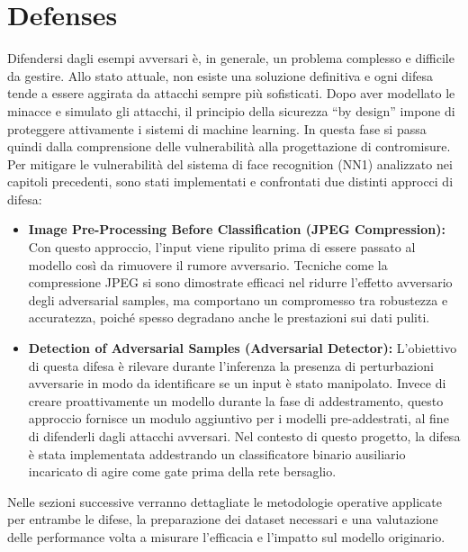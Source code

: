 \documentclass[a4paper, 12pt]{article}
\begin{document}
\section{Defenses}
Difendersi dagli esempi avversari è, in generale, un problema complesso e difficile da gestire. Allo stato attuale, 
non esiste una soluzione definitiva e ogni difesa tende a essere aggirata da attacchi sempre più sofisticati. 
Dopo aver modellato le minacce e simulato gli attacchi, il principio della sicurezza ``by design'' impone di proteggere
attivamente i sistemi di machine learning. In questa fase si passa quindi dalla comprensione delle vulnerabilità 
alla progettazione di contromisure.  Per mitigare le vulnerabilità del sistema di face recognition (NN1) analizzato
nei capitoli precedenti, sono stati implementati e confrontati due distinti approcci di difesa:
\begin{itemize}
    \item \textbf{Image Pre-Processing Before Classification (JPEG Compression):} 
    Con questo approccio, 
    l'input viene ripulito prima di essere passato al modello così da rimuovere il rumore avversario. Tecniche come la 
    compressione JPEG si sono dimostrate efficaci nel ridurre l'effetto avversario degli adversarial samples, ma comportano 
    un compromesso tra robustezza e accuratezza, poiché spesso degradano anche le prestazioni sui dati puliti. 
    \item \textbf{Detection of Adversarial Samples (Adversarial Detector):} L'obiettivo di questa difesa è rilevare durante 
    l'inferenza la presenza di perturbazioni avversarie in modo da identificare se un input è stato manipolato. Invece 
    di creare proattivamente un modello durante la fase di addestramento, questo approccio fornisce un modulo aggiuntivo
    per i modelli pre-addestrati, al fine di difenderli dagli attacchi avversari. Nel contesto di questo progetto, 
    la difesa è stata implementata addestrando un classificatore binario ausiliario incaricato di agire come gate
    prima della  rete bersaglio. 
    \end{itemize}  
Nelle sezioni successive verranno dettagliate le metodologie operative applicate per entrambe le difese, la preparazione
dei dataset necessari e una valutazione delle performance volta a misurare l'efficacia e l'impatto sul modello 
originario.

\vspace{15pt}
\end{document}
